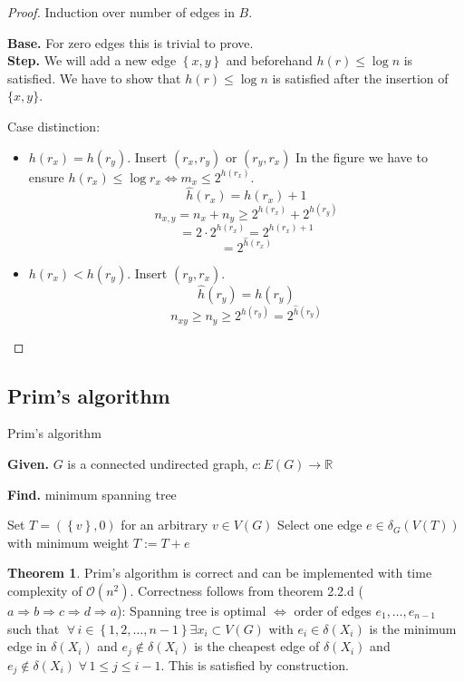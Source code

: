 \documentclass[a4paper]{article}
\theoremstyle{definition}
\newtheorem{theorem}{Theorem}
\newcommand{\set}[1]{\left\{#1\right\}}
\newcommand{\given}[1]{\textbf{Given.} #1\par}
\newcommand{\find}[1]{\textbf{Find.} #1\par}
\newcommand{\fall}{\;\forall\,}
\begin{document}
\begin{proof}
  Induction over number of edges in $B$.

  \textbf{Base.} For zero edges this is trivial to prove. \\
  \textbf{Step.}
    We will add a new edge $\set{x, y}$ and beforehand $h(r) \leq \log{n}$ is satisfied.
    We have to show that $h(r) \leq \log{n}$ is satisfied after the insertion of $\{x, y\}$.

    Case distinction:
    \begin{itemize}
      \item $h(r_x) = h(r_y)$. Insert $(r_x, r_y)$ or $(r_y, r_x)$
        In the figure we have to ensure $h(r_x) \leq \log{r_x} \Leftrightarrow m_x \leq 2^{h(r_x)}$.
        \[
          \hat h(r_x) = h(r_x) + 1
        \] \[
          n_{x,y} = n_x + n_y \geq 2^{h(r_x)} + 2^{h(r_y)}
        \] \[
          = 2 \cdot 2^{h(r_x)} = 2^{h(r_x) + 1}
        \] \[
          = 2^{\hat h(r_x)}
        \]
      \item $h(r_x) < h(r_y)$. Insert $(r_y, r_x)$.
        \[
          \hat h(r_y) = h(r_y)
        \] \[
          n_{xy} \geq n_y \geq 2^{h(r_y)} = 2^{\hat h(r_y)}
        \]
    \end{itemize}
\end{proof}

\subsection{Prim's algorithm}
%
\begin{algorithm}
  \caption{Prim's algorithm}
  \label{prims-algo}
  \given{$G$ is a connected undirected graph, $c: E(G) \rightarrow \mathbb{R}$}
  \find{minimum spanning tree}
\begin{algorithmic}[1]
  \State Set $T = (\set{v}, 0)$ for an arbitrary $v \in V(G)$
    \State Select one edge $e \in \delta_G(V(T))$ with minimum weight
    \State $T := T + e$
  \EndWhile
\end{algorithmic}
\end{algorithm}

\begin{theorem}\label{satz-2.6}
  Prim's algorithm is correct and can be implemented with time complexity of $\mathcal{O}(n^2)$.
  Correctness follows from theorem 2.2.d ($a \Rightarrow b \Rightarrow c \Rightarrow d \Rightarrow a$):
    Spanning tree is optimal $\Leftrightarrow$ order of edges $e_1, \ldots, e_{n-1}$ such that
    $\fall i \in \set{1, 2, \ldots, n-1} \exists x_i \subset V(G)$ with $e_i \in \delta(X_i)$
    is the minimum edge in $\delta(X_i)$ and $e_j \notin \delta(X_i)$ is the cheapest edge of $\delta(X_i)$
    and $e_j \notin \delta(X_i) \fall 1 \leq j \leq i-1$. This is satisfied by construction.
\end{theorem}
\end{document}
